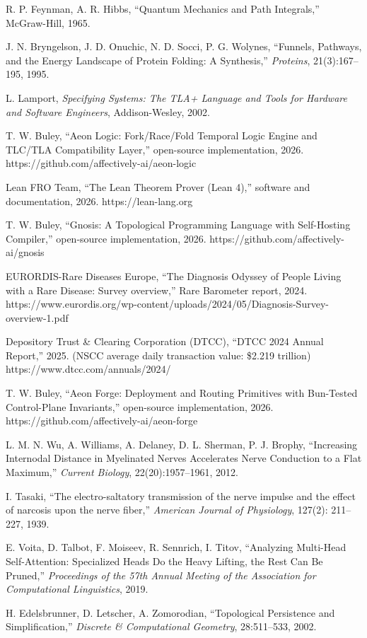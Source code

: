 \documentclass[
]{article}
\begin{document}
R. P. Feynman, A. R. Hibbs, ``Quantum Mechanics and Path Integrals,''
McGraw-Hill, 1965.

J. N. Bryngelson, J. D. Onuchic, N. D. Socci, P. G. Wolynes, ``Funnels,
Pathways, and the Energy Landscape of Protein Folding: A Synthesis,''
\emph{Proteins}, 21(3):167--195, 1995.

L. Lamport, \emph{Specifying Systems: The TLA+ Language and Tools for
Hardware and Software Engineers}, Addison-Wesley, 2002.

T. W. Buley, ``Aeon Logic: Fork/Race/Fold Temporal Logic Engine and
TLC/TLA Compatibility Layer,'' open-source implementation, 2026.
https://github.com/affectively-ai/aeon-logic

Lean FRO Team, ``The Lean Theorem Prover (Lean 4),'' software and
documentation, 2026. https://lean-lang.org

T. W. Buley, ``Gnosis: A Topological Programming Language with
Self-Hosting Compiler,'' open-source implementation, 2026.
https://github.com/affectively-ai/gnosis

EURORDIS-Rare Diseases Europe, ``The Diagnosis Odyssey of People Living
with a Rare Disease: Survey overview,'' Rare Barometer report, 2024.
https://www.eurordis.org/wp-content/uploads/2024/05/Diagnosis-Survey-overview-1.pdf

Depository Trust \& Clearing Corporation (DTCC), ``DTCC 2024 Annual
Report,'' 2025. (NSCC average daily transaction value: \$2.219 trillion)
https://www.dtcc.com/annuals/2024/

T. W. Buley, ``Aeon Forge: Deployment and Routing Primitives with
Bun-Tested Control-Plane Invariants,'' open-source implementation, 2026.
https://github.com/affectively-ai/aeon-forge

L. M. N. Wu, A. Williams, A. Delaney, D. L. Sherman, P. J. Brophy,
``Increasing Internodal Distance in Myelinated Nerves Accelerates Nerve
Conduction to a Flat Maximum,'' \emph{Current Biology},
22(20):1957--1961, 2012.

I. Tasaki, ``The electro-saltatory transmission of the nerve impulse and
the effect of narcosis upon the nerve fiber,'' \emph{American Journal of
Physiology}, 127(2): 211--227, 1939.

E. Voita, D. Talbot, F. Moiseev, R. Sennrich, I. Titov, ``Analyzing
Multi-Head Self-Attention: Specialized Heads Do the Heavy Lifting, the
Rest Can Be Pruned,'' \emph{Proceedings of the 57th Annual Meeting of
the Association for Computational Linguistics}, 2019.

H. Edelsbrunner, D. Letscher, A. Zomorodian, ``Topological Persistence
and Simplification,'' \emph{Discrete \& Computational Geometry},
28:511--533, 2002.
\end{document}
